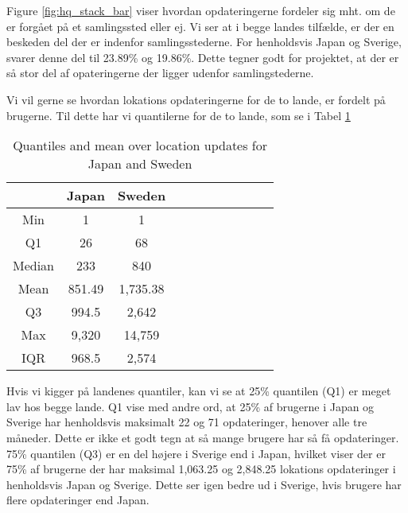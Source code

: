 Figure \ref{fig:hq_stack_bar} viser hvordan opdateringerne fordeler sig mht. om de er forgået på et samlingssted eller ej. Vi ser at i begge landes tilfælde, er der en beskeden del der er indenfor samlingsstederne. For henholdsvis Japan og Sverige, svarer denne del til 23.89\% og 19.86\%. 
Dette tegner godt for projektet, at der er så stor del af opateringerne der ligger udenfor samlingstederne. 

Vi vil gerne se hvordan lokations opdateringerne for de to lande, er fordelt på brugerne. Til dette har vi quantilerne for de to lande, som se i Tabel \ref{tab:stat_loc_updates} 

\begin{table}[htbp]
        \centering
        \small
        \setlength\tabcolsep{2pt}
        \begin{tabular}{|c|c|c|c|c|c|c|c|c|c|c|}
            \hline
                         & Japan      &   Sweden      \\[-1pt]
            \hline
                 Min     &    1       &   1           \\
            \hline
                 Q1      &  26        &   68      \\
            \hline
                 Median  & 233     &   840      \\
            \hline
                 Mean    &  851.49   &  1,735.38     \\
            \hline
                 Q3      & 994.5    &   2,642     \\
            \hline
                 Max     &  9,320 &  14,759     \\
            \hline
                 IQR     &  968.5   &   2,574     \\
            \hline
            
        \end{tabular}
        \caption{Quantiles and mean over location updates for Japan and Sweden} %
        \label{tab:stat_loc_updates}
\end{table}


Hvis vi kigger på landenes quantiler, kan vi se at 25\% quantilen (Q1) er meget lav hos begge lande. Q1 vise med andre ord, at 25\% af brugerne i Japan og Sverige har henholdsvis maksimalt 22 og 71 opdateringer, henover alle tre måneder. Dette er ikke et godt tegn at så mange brugere har så få opdateringer. 75\% quantilen (Q3) er en del højere i Sverige end i Japan, hvilket viser der er 75\% af brugerne der har maksimal 1,063.25 og 2,848.25 lokations opdateringer i henholdsvis Japan og Sverige. Dette ser igen bedre ud i Sverige, hvis brugere har flere opdateringer end Japan. \\ 

